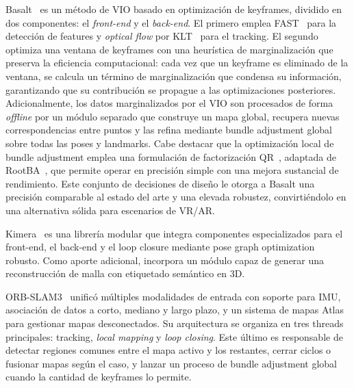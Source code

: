 Basalt~\cite{usenko2020basalt} es un método de VIO basado en optimización de keyframes, dividido en dos componentes: el \textit{front-end} y el \textit{back-end}. El primero emplea FAST~\cite{rosten2006fast} para la detección de features y \textit{optical flow} por KLT~\cite{lucas1981klt} para el tracking. El segundo optimiza una ventana de keyframes con una heurística de marginalización que preserva la eficiencia computacional: cada vez que un keyframe es eliminado de la ventana, se calcula un término de marginalización que condensa su información, garantizando que su contribución se propague a las optimizaciones posteriores. Adicionalmente, los datos marginalizados por el VIO son procesados de forma \textit{offline} por un módulo separado que construye un mapa global, recupera nuevas correspondencias entre puntos y las refina mediante bundle adjustment global sobre todas las poses y landmarks. Cabe destacar que la optimización local de bundle adjustment emplea una formulación de factorización QR~\cite{demmel2022slidingrootba}, adaptada de RootBA~\cite{demmel2021largescalerootba}, que permite operar en precisión simple con una mejora sustancial de rendimiento. Este conjunto de decisiones de diseño le otorga a Basalt una precisión comparable al estado del arte y una elevada robustez, convirtiéndolo en una alternativa sólida para escenarios de VR/AR.

Kimera~\cite{rosinol2020kimera} es una librería modular que integra componentes especializados para el front-end, el back-end y el loop closure mediante pose graph optimization robusto. Como aporte adicional, incorpora un módulo capaz de generar una reconstrucción de malla con etiquetado semántico en 3D.

ORB-SLAM3~\cite{campos2021orbslam3} unificó múltiples modalidades de entrada con soporte para IMU, asociación de datos a corto, mediano y largo plazo, y un sistema de mapas Atlas para gestionar mapas desconectados. Su arquitectura se organiza en tres threads principales: tracking, \textit{local mapping} y \textit{loop closing}. Este último es responsable de detectar regiones comunes entre el mapa activo y los restantes, cerrar ciclos o fusionar mapas según el caso, y lanzar un proceso de bundle adjustment global cuando la cantidad de keyframes lo permite.

